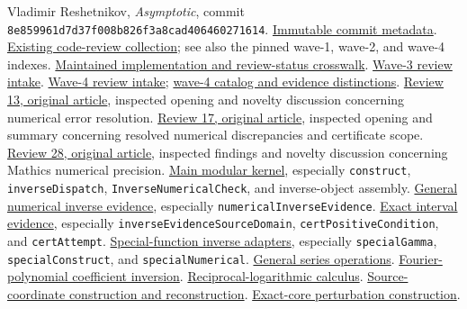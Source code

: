 \documentclass[11pt,letterpaper]{article}
\newcommand{\code}[1]{{\small\nolinkurl{#1}}}
\newcommand{\SHA}{8e859961d7d37f008b826f3a8cad406460271614}
\newcommand{\src}[2]{\href{https://github.com/VladimirReshetnikov/Asymptotic/blob/\SHA/#1}{#2}}
\begin{document}
\begin{thebibliography}{30}
\small
{} Vladimir Reshetnikov, \emph{Asymptotic}, commit \texttt{\SHA}. \href{https://github.com/VladimirReshetnikov/Asymptotic/commit/\SHA}{Immutable commit metadata}.
 \src{external-reports/code-review/README.md}{Existing code-review collection}; see also the pinned wave-1, wave-2, and wave-4 indexes.
 \src{docs/development/CODE_REVIEW_STATUS.md}{Maintained implementation and review-status crosswalk}.
 \src{docs/development/WAVE_3_INTAKE.md}{Wave-3 review intake}.
 \src{docs/development/WAVE_4_INTAKE.md}{Wave-4 review intake}; \src{external-reports/code-review/wave-4/README.md}{wave-4 catalog and evidence distinctions}.
 \src{external-reports/code-review/wave-2/code-review-13/article/asymptotic-incremental-audit.tex}{Review 13, original article}, inspected opening and novelty discussion concerning numerical error resolution.
 \src{external-reports/code-review/wave-2/code-review-17/article/asymptotic_delta_audit.tex}{Review 17, original article}, inspected opening and summary concerning resolved numerical discrepancies and certificate scope.
 \src{external-reports/code-review/wave-4/code-review-28/article.tex}{Review 28, original article}, inspected findings and novelty discussion concerning Mathics numerical precision.
 \src{src/Kernel/AsymptoticAnalysis.wl}{Main modular kernel}, especially \code{construct}, \code{inverseDispatch}, \code{InverseNumericalCheck}, and inverse-object assembly.
 \src{src/Kernel/NumericalInverseChecks.wl}{General numerical inverse evidence}, especially \code{numericalInverseEvidence}.
 \src{src/Kernel/InverseCertificates.wl}{Exact interval evidence}, especially \code{inverseEvidenceSourceDomain}, \code{certPositiveCondition}, and \code{certAttempt}.
 \src{src/Kernel/SpecialFunctionAdapters.wl}{Special-function inverse adapters}, especially \code{specialGamma}, \code{specialConstruct}, and \code{specialNumerical}.
 \src{src/Kernel/SeriesOperations.wl}{General series operations}.
 \src{src/Kernel/FourierCoefficients.wl}{Fourier-polynomial coefficient inversion}.
 \src{src/Kernel/ReciprocalLogOperations.wl}{Reciprocal-logarithmic calculus}.
 \src{src/Kernel/SourceCoordinates.wl}{Source-coordinate construction and reconstruction}.
 \src{src/Kernel/CorePerturbation.wl}{Exact-core perturbation construction}.

\end{thebibliography}
\end{document}
